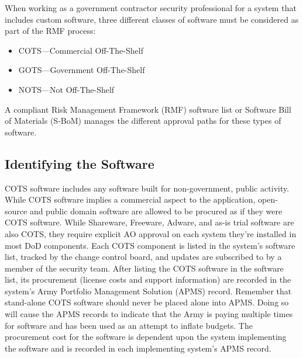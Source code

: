 When working as a government contractor security professional for a system that includes custom software, three different classes of software must be considered as part of the RMF process:
\begin{itemize}
	\item COTS---Commercial Off-The-Shelf
	\item GOTS---Government Off-The-Shelf
	\item NOTS---Not Off-The-Shelf
\end{itemize}

A compliant Risk Management Framework (RMF) software list or Software Bill of Materials (S-BoM) manages the different approval paths for these types of software.

\subsection{Identifying the Software}

COTS software includes any software built for non-government, public activity. While COTS software implies a commercial aspect to the application, open-source and public domain software are allowed to be procured as if they were COTS software. While Shareware, Freeware, Adware, and as-is trial software are also COTS, they require explicit AO approval on each system they're installed in most DoD components.\autocite[II.4–6.g]{20210405-ar25-2} Each COTS component is listed in the system’s software list, tracked by the change control board, and updates are subscribed to by a member of the security team. After listing the COTS software in the software list, its procurement (license costs and support information) are recorded in the system’s Army Portfolio Management Solution (APMS) record. Remember that stand-alone COTS software should never be placed alone into APMS. Doing so will cause the APMS records to indicate that the Army is paying multiple times for software and has been used as an attempt to inflate budgets. The procurement cost for the software is dependent upon the system implementing the software and is recorded in each implementing system's APMS record.


